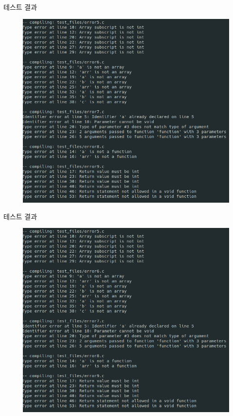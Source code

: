 \documentclass{bredelebeamer}
\begin{document}
\begin{frame}{테스트 결과}
	\begin{figure}
		\includegraphics[scale=0.4]{images/coverage2.png}
	\end{figure}
\end{frame}

\begin{frame}{테스트 결과}
	\begin{figure}
		\includegraphics[scale=0.4]{images/coverage2.png}
	\end{figure}
\end{frame}
\end{document}
